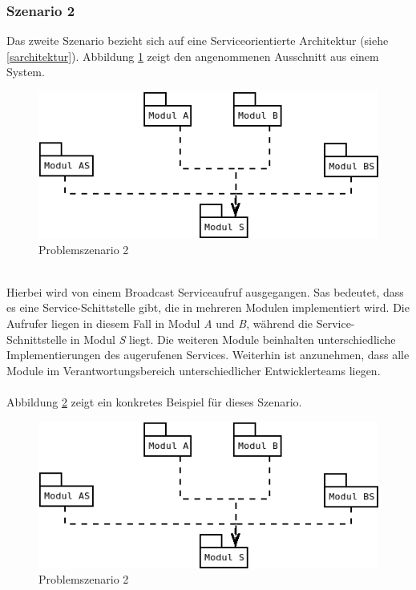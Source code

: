 \documentclass[11pt, 
ngerman,
doublespacing,
chapterinoneline, %
consistentlayout, %
]{scrartcl}
\begin{document}
\subsubsection{Szenario 2}\label{prob2}
Das zweite Szenario bezieht sich auf eine Serviceorientierte Architektur (siehe \ref{sarchitektur}).
Abbildung \ref{fig:problem2} zeigt den angenommenen Ausschnitt aus einem System. 
\begin{figure}[h]
  \centering
  \includegraphics[scale=0.7]{pics/problemS2Abstrakt.png}
  \caption{Problemszenario 2}
  \label{fig:problem2}
\end{figure}\\
Hierbei wird von einem Broadcast Serviceaufruf ausgegangen. Sas bedeutet, dass es eine Service-Schittstelle gibt, die in mehreren Modulen implementiert wird. Die Aufrufer liegen in diesem Fall in Modul \emph{A} und \emph{B}, während die Service-Schnittstelle in Modul \emph{S} liegt. Die weiteren Module beinhalten unterschiedliche Implementierungen des augerufenen Services. Weiterhin ist anzunehmen, dass alle Module im Verantwortungsbereich unterschiedlicher Entwicklerteams liegen.\\\\
Abbildung \ref{fig:problem2Konkret} zeigt ein konkretes Beispiel für dieses Szenario.
\begin{figure}[h]
  \centering
  \includegraphics[scale=0.7]{pics/problemS2Abstrakt.png}
  \caption{Problemszenario 2}
  \label{fig:problem2Konkret}
\end{figure}\\
\end{document}
